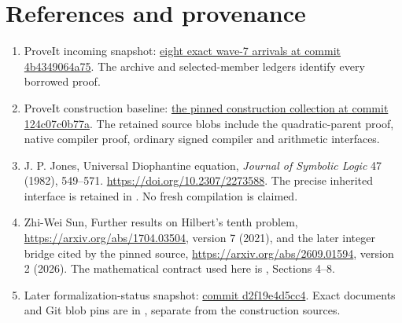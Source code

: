 \documentclass[11pt]{article}
\begin{document}
\section*{References and provenance}
\begin{enumerate}
\item ProveIt incoming snapshot:
\href{https://github.com/VladimirReshetnikov/ProveIt/tree/4b4349064a750ba6347293b55874a7f92abdd0db/docs/incoming}{eight exact wave-7 arrivals at commit 4b4349064a75}.
The archive and selected-member ledgers identify every borrowed proof.
\item ProveIt construction baseline:
\href{https://github.com/VladimirReshetnikov/ProveIt/tree/124c07c0b77a9e20e84676514d8b1ff78536ea3f/Computability/DiophantineConsistency/con-zfc-diophantine-forms}{the pinned construction collection at commit 124c07c0b77a}.
The retained source blobs include the quadratic-parent proof, native
compiler proof, ordinary signed compiler and arithmetic interfaces.
\item J. P. Jones, Universal Diophantine equation, \emph{Journal of Symbolic
Logic} 47 (1982), 549--571. \url{https://doi.org/10.2307/2273588}.
The precise inherited interface is retained in
. No fresh compilation is claimed.
\item Zhi-Wei Sun, Further results on Hilbert's tenth problem,
\url{https://arxiv.org/abs/1704.03504}, version 7 (2021), and the later
integer bridge cited by the pinned source,
\url{https://arxiv.org/abs/2609.01594}, version 2 (2026).
The mathematical contract used here is
, Sections 4--8.
\item Later formalization-status snapshot:
\href{https://github.com/VladimirReshetnikov/ProveIt/tree/d2f19e4d5cc4030f60049333285eea86a1ef401c/Computability/DiophantineConsistency}{commit d2f19e4d5cc4}.
Exact documents and Git blob pins are in ,
separate from the construction sources.
\end{enumerate}
\end{document}
